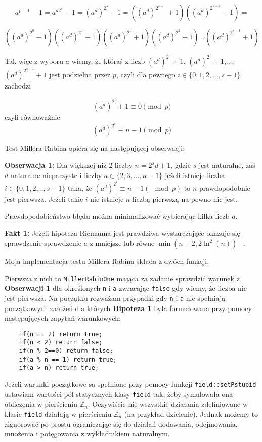\documentclass{article}
\begin{document}
$$ a^{p-1}-1=a^{d2^s}-1=(a^d)^{2^s}-1=((a^d)^{2^{s-1}}+1)((a^d)^{2^{s-1}}-1)=$$


$$((a^d)^{2^0}-1)((a^d)^{2^0}+1)((a^d)^{2^1}+1)((a^d)^{2^2}+1)...((a^d)^{2^{s-1}}+1) $$

Tak więc z wyboru $a$ wiemy, że któraś z liczb  $(a^d)^{2^0}+1$, $(a^d)^{2^1}+1$,..., $(a^d)^{2^{s-1}}+1$
jest podzielna przez $p$, czyli dla pewnego $i \in \{0,1,2,...,s-1\}$ zachodzi 

$$(a^d)^{2 ^i} + 1\equiv 0 \pmod p$$
czyli równoważnie 
$$(a^d)^{2 ^i} \equiv n-1\pmod p$$

Test Millera-Rabina opiera się na następującej obserwacji:
\begin{tcolorbox}
\textbf{Obserwacja 1:} Dla większej niż $2$ liczby $n=2^sd+1$, gdzie $s$ jest naturalne, zaś $d$ naturalne nieparzyste i liczby $
a \in \{2,3,...,n-1\}$
jeżeli istnieje liczba $i \in \{0,1,2,..,s-1\}$ taka, że $(a^d)^{2^i} \equiv n-1 (\mod p)$ to $n$
prawdopodobnie jest pierwsza. Jeżeli takie $i$ nie istnieje $n$ liczbą pierwszą na pewno nie jest.
\end{tcolorbox}

Prawdopodobieństwo błędu można minimalizować wybierając kilka liczb $a$. 
\begin{tcolorbox}
    \textbf{Fakt 1:} Jeżeli hipoteza Riemanna jest 
    prawdziwa wystarczające okazuje się sprawdzenie sprawdzenie $a$ z mniejsze lub równe 
    $\min(n-2,2\ln^2(n))$ ~\cite{durnoga2017large}.
    
\end{tcolorbox}

Moja implementacja testu Millera Rabina składa z dwóch funkcji. 

Pierwsza z nich to \texttt{MillerRabinOne} mająca za zadanie sprawdzić warunek z \textbf{Obserwacji 1} dla określonych
\texttt{n} i \texttt{a} zwracając \texttt{false} gdy wiemy, że liczba nie jest pierwsza.
Na początku rozważam przypadki gdy \texttt{n} i \texttt{a} nie spełniają początkowych założeń dla których
\textbf{Hipoteza 1} była formułowana przy pomocy następujących zapytań warunkowych:
\begin{verbatim}
    if(n == 2) return true;
    if(n < 2) return false;
    if(n % 2==0) return false;
    if(a % n == 1) return true;
    if(a > n) return true;
\end{verbatim}

Jeżeli warunki początkowe są spełnione przy pomocy funkcji \texttt{field::setPstupid} ustawiam wartości pól statycznych klasy 
\texttt{field} tak, żeby symulowała
ona obliczenia w pierścieniu $\mathbb{Z}_n$. Oczywiście nie wszystkie działania zdefiniowane
w klasie \texttt{field} działają w pierścieniu $\mathbb{Z}_n$ (na przykład dzielenie). Jednak
możemy to zignorować po prostu ograniczając się do działań dodawania, odejmowania, mnożenia i potęgowania
z wykładnikiem naturalnym.
\end{document}
